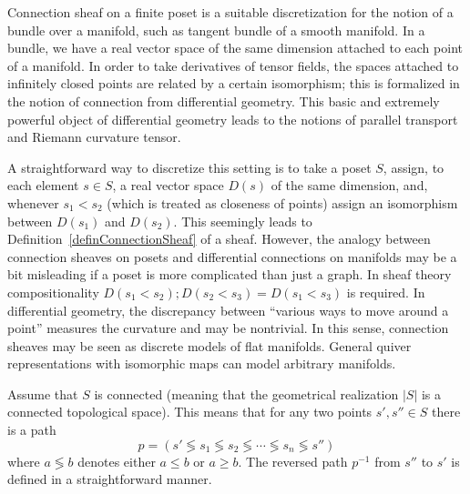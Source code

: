 \begin{rem}\label{remDifGeomConnections}
Connection sheaf on a finite poset is a suitable discretization for the notion of a bundle over a manifold, such as tangent bundle of a smooth manifold. In a bundle, we have a real vector space of the same dimension attached to each point of a manifold. In order to take derivatives of tensor fields, the spaces attached to infinitely closed points are related by a certain isomorphism; this is formalized in the notion of connection from differential geometry. This basic and extremely powerful object of differential geometry leads to the notions of parallel transport and Riemann curvature tensor.

A straightforward way to discretize this setting is to take a poset $S$, assign, to each element $s\in S$, a real vector space $D(s)$ of the same dimension, and, whenever $s_1<s_2$ (which is treated as closeness of points) assign an isomorphism between $D(s_1)$ and $D(s_2)$. This seemingly leads to Definition~\ref{definConnectionSheaf} of a sheaf. However, the analogy between connection sheaves on posets and differential connections on manifolds may be a bit misleading if a poset is more complicated than just a graph. In sheaf theory compositionality $D(s_1<s_2);D(s_2<s_3)=D(s_1<s_3)$ is required. In differential geometry, the discrepancy between ``various ways to move around a point'' measures the curvature and may be nontrivial. In this sense, connection sheaves may be seen as discrete models of flat manifolds. General quiver representations with isomorphic maps can model arbitrary manifolds.
\end{rem}

Assume that $S$ is connected (meaning that the geometrical realization $|S|$ is a connected topological space). This means that for any two points $s',s''\in S$ there is a path
\[
p=(s'\lessgtr s_1\lessgtr s_2\lessgtr \cdots \lessgtr s_n\lessgtr s'')
\]
where $a\lessgtr b$ denotes either $a\leq b$ or $a\geq b$. The reversed path $p^{-1}$ from $s''$ to $s'$ is defined in a straightforward manner.

